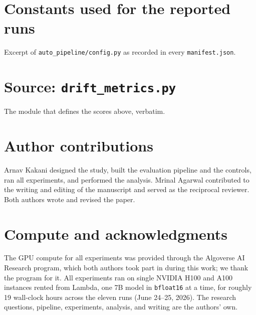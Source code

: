 \documentclass{article}
\begin{document}
\section{Constants used for the reported runs}
\label{sec:constants}
Excerpt of \texttt{auto\_pipeline/config.py} as recorded in every \texttt{manifest.json}.


\section{Source: \texttt{drift\_metrics.py}}
The module that defines the scores above, verbatim.


\section{Author contributions}
Arnav Kakani designed the study, built the evaluation pipeline and the controls, ran all experiments, and performed the analysis. Mrinal Agarwal contributed to the writing and editing of the manuscript and served as the reciprocal reviewer. Both authors wrote and revised the paper.

\section{Compute and acknowledgments}
The GPU compute for all experiments was provided through the Algoverse AI Research program, which both authors took part in during this work; we thank the program for it. All experiments ran on single NVIDIA H100 and A100 instances rented from Lambda, one 7B model in \texttt{bfloat16} at a time, for roughly 19 wall-clock hours across the eleven runs (June 24--25, 2026). The research questions, pipeline, experiments, analysis, and writing are the authors' own.
\end{document}
